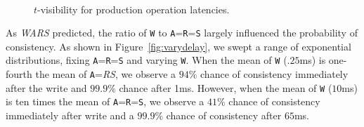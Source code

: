 \documentclass{vldb}
\begin{document}
\begin{figure}
\centering
{}\\[-1mm]
\caption{$t$-visibility for production operation latencies.}
\label{fig:tvis}
\end{figure}

As \textit{WARS} predicted, the ratio of \texttt{W} to
\texttt{A}=\texttt{R}=\texttt{S} largely influenced the probability of
consistency.  As shown in Figure~\ref{fig:varydelay}, we swept a range
of exponential distributions, fixing \texttt{A}=\texttt{R}=\texttt{S}
and varying \texttt{W}.  When the mean of \texttt{W} ($.25$ms) is
one-fourth the mean of \texttt{A}=\textit{R}\textit{S}, we observe a
$94\%$ chance of consistency immediately after the write and $99.9\%$
chance after 1ms.  However, when the mean of \texttt{W} ($10$ms) is
ten times the mean of \texttt{A}=\texttt{R}=\texttt{S}, we observe a
$41\%$ chance of consistency immediately after write and a $99.9\%$
chance of consistency after $65$ms.
\end{document}
